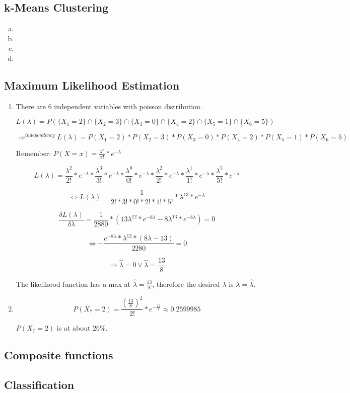 \documentclass[12pt]{article}
\begin{document}

\setcounter{section}{4}

\subsection{k-Means Clustering}
\begin{enumerate}[a)]

    \item 
      

    \item 

    \item 

    \item 
        
\end{enumerate}

\subsection{Maximum Likelihood Estimation}

	\begin{enumerate}
	
	\item

	There are 6 independent variables with poisson distribution.
	
	$$L(\lambda)= P(\{X_1=2\} \cap \{X_2=3\} \cap \{X_3=0\} \cap \{X_4=2\} \cap \{X_5=1\} \cap \{X_6=5\})$$
	
	$$\Rightarrow^{independency} L(\lambda)= P(X_1=2) * P(X_2=3) * P(X_3=0) * P(X_4=2) * P(X_5=1) * P(X_6=5)$$
	
	Remember: $P(X=x)= \frac{\lambda^x}{x!}*e^{-\lambda}$
	
	$$L(\lambda)= \frac{\lambda^2}{2!}*e^{-\lambda} * \frac{\lambda^3}{3!}*e^{-\lambda} * \frac{\lambda^0}{0!}*e^{-\lambda} * \frac{\lambda^2}{2!}*e^{-\lambda} * \frac{\lambda^1}{1!}*e^{-\lambda} * \frac{\lambda^5}{5!}*e^{-\lambda} $$
	
	$$ \Leftrightarrow L(\lambda)= \frac{1}{2!*3!*0!*2!*1!*5!} * \lambda^{13} * e^{-\lambda} $$
	
	$$ \frac{\delta L(\lambda)}{\delta \lambda} = \frac{1}{2880}*(13\lambda^{12}*e^{-8\lambda} -8\lambda^{13}*e^{-8\lambda})=0$$
	
	$$ \Leftrightarrow -\frac{e^{-8\lambda}*\lambda^{12}*(8\lambda-13)}{2280} = 0 $$
	
	$$ \Rightarrow \hat{\lambda}=0 \vee \hat{\lambda}=\frac{13}{8} $$
	
	The likelihood function has a max at $\hat{\lambda}=\frac{13}{8}$, therefore the desired $\lambda$ is $\lambda=\hat{\lambda}$.

	\item	
	
	$$ P(X_7=2) = \frac{(\frac{13}{8})^2}{2!} * e^{-\frac{13}{8}} \approx 0.2599985 $$
	
	$ P(X_7=2)$ is at about 26\%.
	
	\end{enumerate}

\subsection{Composite functions}

\subsection{Classification}
\end{document}
